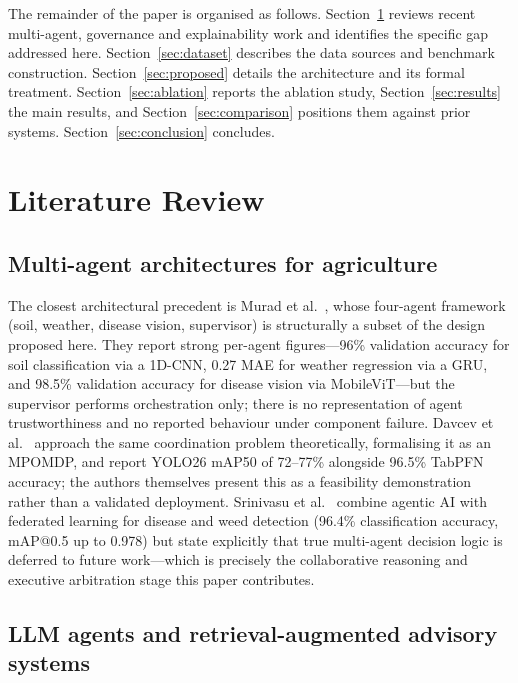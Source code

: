 \documentclass[preprint,12pt]{elsarticle}
\begin{document}
The remainder of the paper is organised as follows.
Section~\ref{sec:related} reviews recent multi-agent, governance and
explainability work and identifies the specific gap addressed here.
Section~\ref{sec:dataset} describes the data sources and benchmark
construction. Section~\ref{sec:proposed} details the architecture and its
formal treatment. Section~\ref{sec:ablation} reports the ablation study,
Section~\ref{sec:results} the main results, and
Section~\ref{sec:comparison} positions them against prior systems.
Section~\ref{sec:conclusion} concludes.

\section{Literature Review}
\label{sec:related}

\subsection{Multi-agent architectures for agriculture}

The closest architectural precedent is Murad et
al.~\cite{murad2026agentic}, whose four-agent framework (soil, weather,
disease vision, supervisor) is structurally a subset of the design proposed
here. They report strong per-agent figures---96\% validation accuracy for
soil classification via a 1D-CNN, 0.27 MAE for weather regression via a
GRU, and 98.5\% validation accuracy for disease vision via MobileViT---but
the supervisor performs orchestration only; there is no representation of
agent trustworthiness and no reported behaviour under component failure.
Davcev et al.~\cite{davcev2026multiagent} approach the same coordination
problem theoretically, formalising it as an MPOMDP, and report YOLO26
mAP50 of 72--77\% alongside 96.5\% TabPFN accuracy; the authors themselves
present this as a feasibility demonstration rather than a validated
deployment. Srinivasu et al.~\cite{srinivasu2026federated} combine agentic
AI with federated learning for disease and weed detection (96.4\%
classification accuracy, mAP@0.5 up to 0.978) but state explicitly that
true multi-agent decision logic is deferred to future work---which is
precisely the collaborative reasoning and executive arbitration stage this
paper contributes.

\subsection{LLM agents and retrieval-augmented advisory systems}
\end{document}
